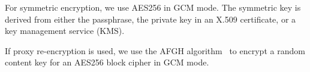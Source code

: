 \documentclass[notitlepage,longbibliography]{revtex4-1}
\begin{document}
For symmetric encryption, we use AES256 in GCM mode.
The symmetric key is derived from either the passphrase, the private key in an X.509 certificate, or a key management service (KMS).

If proxy re-encryption is used, we use the AFGH algorithm~\cite{afgh} to encrypt a random content key for an AES256 block cipher in GCM mode.


\end{document}
